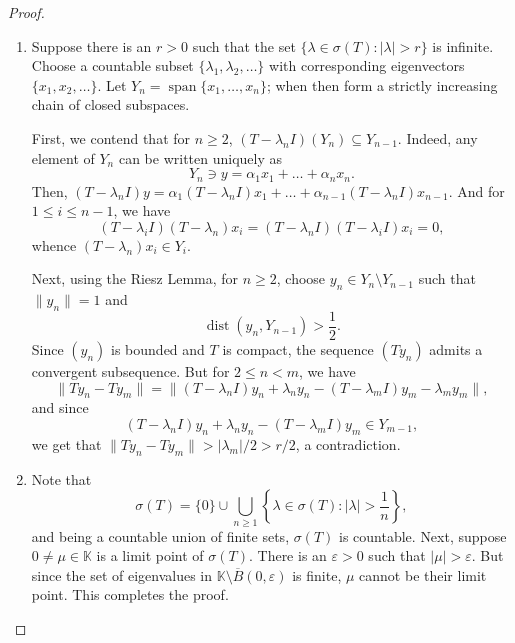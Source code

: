\documentclass[11pt]{article}
\theoremstyle{thmstyle}
\theoremstyle{defstyle}
\newcommand{\R}{\mathbb{R}}
\newcommand{\bbC}{\mathbb{C}}
\newcommand{\K}{\mathbb{K}} %
\renewcommand{\le}{\leqslant}
\renewcommand{\ge}{\geqslant}
\begin{document}
\begin{proof}
\begin{enumerate}[label=(\alph*)]
    \item Suppose there is an $r > 0$ such that the set $\{\lambda\in\sigma(T)\colon|\lambda| > r\}$ is infinite. Choose a countable subset $\{\lambda_1,\lambda_2,\dots\}$ with corresponding eigenvectors $\{x_1, x_2,\dots\}$. Let $Y_n = \operatorname{span}\{x_1,\dots, x_n\}$; when then form a strictly increasing chain of closed subspaces.

    First, we contend that for $n\ge 2$, $(T - \lambda_n I)(Y_n)\subseteq Y_{n - 1}$. Indeed, any element of $Y_n$ can be written uniquely as 
    \begin{equation*}
        Y_n \ni y = \alpha_1x_1 + \dots + \alpha_nx_n.
    \end{equation*}
    Then, $(T - \lambda_nI)y = \alpha_1(T - \lambda_n I)x_1 + \dots + \alpha_{n - 1}(T - \lambda_n I)x_{n - 1}$. And for $1\le i\le n - 1$, we have 
    \begin{equation*}
        (T - \lambda_i I)(T - \lambda_n)x_i = (T - \lambda_n I)(T - \lambda_iI)x_i = 0,
    \end{equation*}
    whence $(T - \lambda_n)x_i\in Y_i$.

    Next, using the Riesz Lemma, for $n\ge 2$, choose $y_n\in Y_n\setminus Y_{n - 1}$ such that $\|y_n\| = 1$ and 
    \begin{equation*}
        \operatorname{dist}(y_n, Y_{n - 1}) > \frac{1}{2}.
    \end{equation*}
    Since $(y_n)$ is bounded and $T$ is compact, the sequence $(Ty_n)$ admits a convergent subsequence. But for $2\le n < m$, we have
    \begin{equation*}
        \|Ty_n - Ty_m\| = \|(T - \lambda_n I)y_n + \lambda_ny_n - (T - \lambda_m I)y_m - \lambda_my_m\|,
    \end{equation*}
    and since 
    \begin{equation*}
        (T - \lambda_nI)y_n + \lambda_ny_n - (T - \lambda_mI)y_m\in Y_{m - 1},
    \end{equation*}
    we get that $\|Ty_n - Ty_m\| > |\lambda_m|/2 > r/2$, a contradiction.

    \item Note that 
    \begin{equation*}
        \sigma(T) = \{0\}\cup\bigcup_{n\ge 1}\left\{\lambda\in\sigma(T)\colon |\lambda| > \frac{1}{n}\right\},
    \end{equation*}
    and being a countable union of finite sets, $\sigma(T)$ is countable. Next, suppose $0\ne\mu\in\K$ is a limit point of $\sigma(T)$. There is an $\varepsilon > 0$ such that $|\mu| > \varepsilon$. But since the set of eigenvalues in $\K\setminus\overline{B}(0,\varepsilon)$ is finite, $\mu$ cannot be their limit point. This completes the proof. \qedhere
\end{enumerate}
\end{proof}
\end{document}
